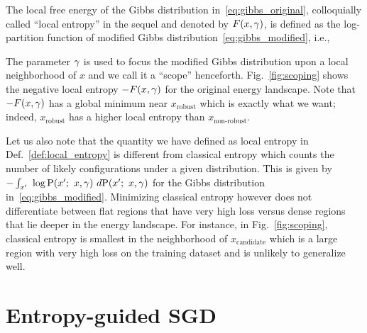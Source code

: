 \documentclass[10pt]{article}
\newcommand{\ignore}[1]{}
\begin{document}
\begin{definition}
\label{def:local_entropy}
The local free energy of the Gibbs distribution in~\eqref{eq:gibbs_original}, colloquially called ``local entropy'' in the sequel and denoted by $F(x, \gamma)$, is defined as the log-partition function of modified Gibbs distribution~\eqref{eq:gibbs_modified}, i.e.,
\end{definition}
The parameter $\gamma$ is used to focus the modified Gibbs distribution upon a local neighborhood of $x$ and we call it a ``scope'' henceforth. Fig.~\ref{fig:scoping} shows the negative local entropy $-F(x, \gamma)$ for the original energy landscape. Note that $-F(x,\gamma)$ has a global minimum near $x_{\textrm{robust}}$ which is exactly what we want; indeed, $x_{\textrm{robust}}$ has a higher local entropy than $x_{\textrm{non-robust}}$.

Let us also note that the quantity we have defined as local entropy in Def.~\ref{def:local_entropy} is different from classical entropy which counts the number of likely configurations under a given distribution. This is given by
$
    - \int_{x'}\ \log \mathrm{P}(x';\ x, \gamma)\ d \mathrm{P}(x';\ x, \gamma)
$
for the Gibbs distribution in~\eqref{eq:gibbs_modified}. Minimizing classical entropy however does not differentiate between flat regions that have very high loss versus dense regions that lie deeper in the energy landscape. For instance, in Fig.~\ref{fig:scoping}, classical entropy is smallest in the neighborhood of $x_{\textrm{candidate}}$ which is a large region with very high loss on the training dataset and is unlikely to generalize well.
\ignore{We could minimize a modified loss function of the form $f(x) + \lambda S(x, \g)$ whose gradient can be computed to be
$$
    \nabla \Big(f(x) + \lambda S(x, \g)\Big) = \nabla f(x) - \lambda \g\ \corr (g(x'),\ x-x');
$$
where we have defined the cross-correlation as
$$
    \corr (g(x'),\ x-x') := \ag{g(x')\ (x-x')} - \ag{g(x')}\ \ag{x-x'};
$$
with $g(x') = f(x') + \f{\g}{2}\ \norm{x-x'}^2_2$. The gradient of the entropy can again be estimated using Langevin dynamics. Practically, one then has to modulate the hyper-parameter $\lambda$ during the course of the training to first use the gradient $\nabla f(x)$ to make progress and then turn on the entropy term to scope dense clusters.}

\section{Entropy-guided SGD}
\label{s:entropysgd}
\end{document}
